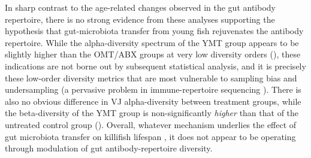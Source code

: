 In sharp contrast to the age-related changes observed in the gut antibody repertoire, there is no strong evidence from these analyses supporting the hypothesis that gut-microbiota transfer from young fish rejuvenates the antibody repertoire. While the alpha-diversity spectrum of the YMT group appears to be slightly higher than the OMT/ABX groups at very low diversity orders (), these indications are not borne out by subsequent statistical analysis, and it is precisely these low-order diversity metrics that are most vulnerable to sampling bias and undersampling (a pervasive problem in immune-repertoire sequencing \parencite{mora2016diversity}). There is also no obvious difference in VJ alpha-diversity between treatment groups, while the beta-diversity of the YMT group is non-significantly \textit{higher} than that of the untreated control group (). Overall, whatever mechanism underlies the effect of gut microbiota transfer on killifish lifespan \parencite{smith2017microbiota}, it does not appear to be operating through modulation of gut antibody-repertoire diversity.

